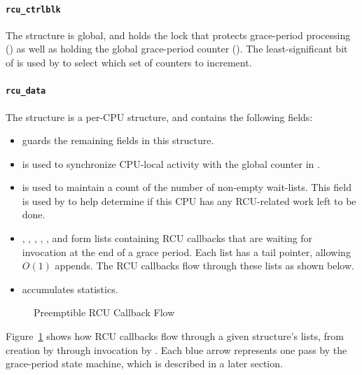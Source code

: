 \paragraph{{\tt rcu\_ctrlblk}}
\label{app:rcuimpl:rcu_ctrlblk}

The  structure is global, and holds the lock
that protects grace-period processing () as well
as holding the global grace-period counter ().
The least-significant bit of  is used by
 to select which set of counters to increment.

\paragraph{{\tt rcu\_data}}
\label{app:rcuimpl:rcu_data}

The  structure is a per-CPU structure, and
contains the following fields:

\begin{itemize}
\item	{} guards the remaining fields in this structure.
\item	{} is used to synchronize CPU-local
	activity with the global counter in .
\item	{} is used to maintain a count of the
	number of non-empty wait-lists.
	This field is used by  to help determine
	if this CPU has any RCU-related work left to be done.
\item	{}, , ,
	, , and
	 form lists containing
	RCU callbacks that are waiting for invocation at the end
	of a grace period.
	Each list has a tail pointer, allowing $O\left(1\right)$ appends.
	The RCU callbacks flow through these lists as shown below.
\item	{} accumulates statistics.
\end{itemize}

\begin{figure}[htb]
\centering
{}
\caption{Preemptible RCU Callback Flow}
\label{app:rcuimpl:Preemptible RCU Callback Flow}
\end{figure}

Figure~\ref{app:rcuimpl:Preemptible RCU Callback Flow}
shows how RCU callbacks flow through a given
 structure's lists, from creation by
 through invocation by
.
Each blue arrow represents one pass by the grace-period state machine,
which is described in a later section.



